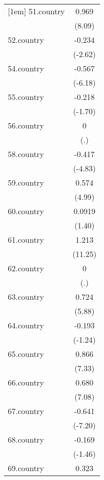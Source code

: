 {\begin{tabular}{l*{1}{c}}
[1em]
51.country  &       0.969\sym{***}\\
            &      (8.09)         \\
[1em]
52.country  &      -0.234\sym{**} \\
            &     (-2.62)         \\
[1em]
54.country  &      -0.567\sym{***}\\
            &     (-6.18)         \\
[1em]
55.country  &      -0.218         \\
            &     (-1.70)         \\
[1em]
56.country  &           0         \\
            &         (.)         \\
[1em]
58.country  &      -0.417\sym{***}\\
            &     (-4.83)         \\
[1em]
59.country  &       0.574\sym{***}\\
            &      (4.99)         \\
[1em]
60.country  &      0.0919         \\
            &      (1.40)         \\
[1em]
61.country  &       1.213\sym{***}\\
            &     (11.25)         \\
[1em]
62.country  &           0         \\
            &         (.)         \\
[1em]
63.country  &       0.724\sym{***}\\
            &      (5.88)         \\
[1em]
64.country  &      -0.193         \\
            &     (-1.24)         \\
[1em]
65.country  &       0.866\sym{***}\\
            &      (7.33)         \\
[1em]
66.country  &       0.680\sym{***}\\
            &      (7.08)         \\
[1em]
67.country  &      -0.641\sym{***}\\
            &     (-7.20)         \\
[1em]
68.country  &      -0.169         \\
            &     (-1.46)         \\
[1em]
69.country  &       0.323\sym{**} \\

\end{tabular}}
